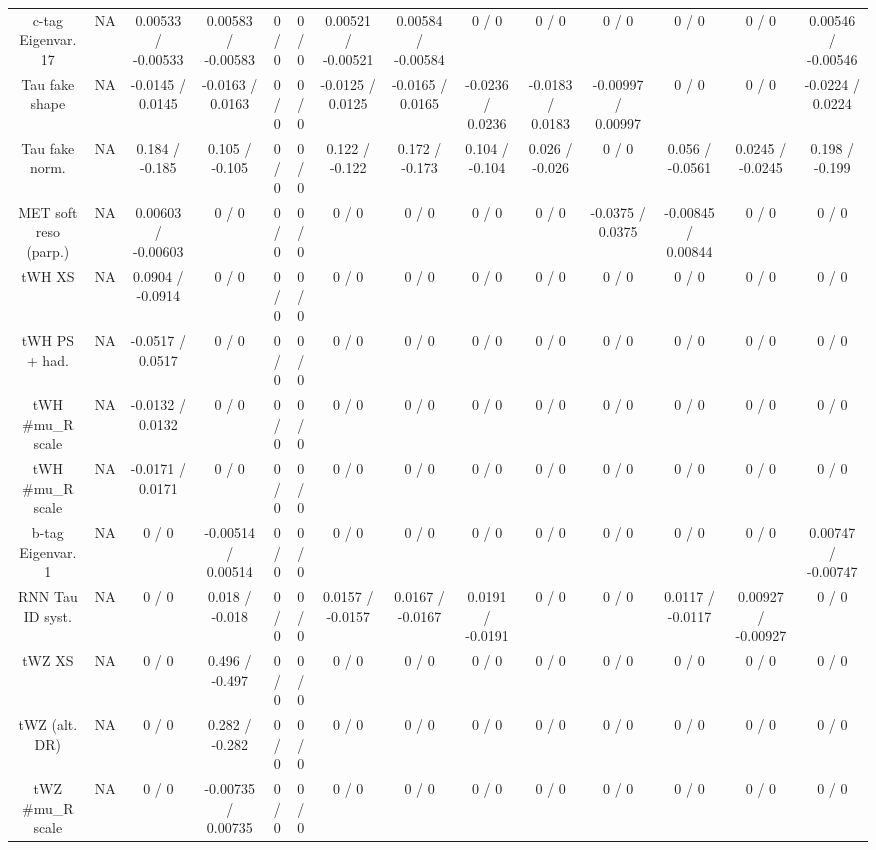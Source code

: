 \documentclass[10pt]{article}
\begin{document}
\begin{table}[htbp]
\begin{center}
\begin{tabular}{|c|c|c|c|c|c|c|c|c|c|c|c|c|c|}
  c-tag Eigenvar. 17 &    NA    & 0.00533 / -0.00533 & 0.00583 / -0.00583 & 0 / 0 & 0 / 0 & 0.00521 / -0.00521 & 0.00584 / -0.00584 & 0 / 0 & 0 / 0 & 0 / 0 & 0 / 0 & 0 / 0 & 0.00546 / -0.00546 \\ 
  Tau fake shape &    NA    & -0.0145 / 0.0145 & -0.0163 / 0.0163 & 0 / 0 & 0 / 0 & -0.0125 / 0.0125 & -0.0165 / 0.0165 & -0.0236 / 0.0236 & -0.0183 / 0.0183 & -0.00997 / 0.00997 & 0 / 0 & 0 / 0 & -0.0224 / 0.0224 \\ 
  Tau fake norm. &    NA    & 0.184 / -0.185 & 0.105 / -0.105 & 0 / 0 & 0 / 0 & 0.122 / -0.122 & 0.172 / -0.173 & 0.104 / -0.104 & 0.026 / -0.026 & 0 / 0 & 0.056 / -0.0561 & 0.0245 / -0.0245 & 0.198 / -0.199 \\ 
  MET soft reso (parp.) &    NA    & 0.00603 / -0.00603 & 0 / 0 & 0 / 0 & 0 / 0 & 0 / 0 & 0 / 0 & 0 / 0 & 0 / 0 & -0.0375 / 0.0375 & -0.00845 / 0.00844 & 0 / 0 & 0 / 0 \\ 
  tWH XS &    NA    & 0.0904 / -0.0914 & 0 / 0 & 0 / 0 & 0 / 0 & 0 / 0 & 0 / 0 & 0 / 0 & 0 / 0 & 0 / 0 & 0 / 0 & 0 / 0 & 0 / 0 \\ 
  tWH PS + had. &    NA    & -0.0517 / 0.0517 & 0 / 0 & 0 / 0 & 0 / 0 & 0 / 0 & 0 / 0 & 0 / 0 & 0 / 0 & 0 / 0 & 0 / 0 & 0 / 0 & 0 / 0 \\ 
  tWH #mu_{R} scale &    NA    & -0.0132 / 0.0132 & 0 / 0 & 0 / 0 & 0 / 0 & 0 / 0 & 0 / 0 & 0 / 0 & 0 / 0 & 0 / 0 & 0 / 0 & 0 / 0 & 0 / 0 \\ 
  tWH #mu_{R} scale &    NA    & -0.0171 / 0.0171 & 0 / 0 & 0 / 0 & 0 / 0 & 0 / 0 & 0 / 0 & 0 / 0 & 0 / 0 & 0 / 0 & 0 / 0 & 0 / 0 & 0 / 0 \\ 
  b-tag Eigenvar. 1 &    NA    & 0 / 0 & -0.00514 / 0.00514 & 0 / 0 & 0 / 0 & 0 / 0 & 0 / 0 & 0 / 0 & 0 / 0 & 0 / 0 & 0 / 0 & 0 / 0 & 0.00747 / -0.00747 \\ 
  RNN Tau ID syst. &    NA    & 0 / 0 & 0.018 / -0.018 & 0 / 0 & 0 / 0 & 0.0157 / -0.0157 & 0.0167 / -0.0167 & 0.0191 / -0.0191 & 0 / 0 & 0 / 0 & 0.0117 / -0.0117 & 0.00927 / -0.00927 & 0 / 0 \\ 
  tWZ XS &    NA    & 0 / 0 & 0.496 / -0.497 & 0 / 0 & 0 / 0 & 0 / 0 & 0 / 0 & 0 / 0 & 0 / 0 & 0 / 0 & 0 / 0 & 0 / 0 & 0 / 0 \\ 
  tWZ (alt. DR) &    NA    & 0 / 0 & 0.282 / -0.282 & 0 / 0 & 0 / 0 & 0 / 0 & 0 / 0 & 0 / 0 & 0 / 0 & 0 / 0 & 0 / 0 & 0 / 0 & 0 / 0 \\ 
  tWZ #mu_{R} scale &    NA    & 0 / 0 & -0.00735 / 0.00735 & 0 / 0 & 0 / 0 & 0 / 0 & 0 / 0 & 0 / 0 & 0 / 0 & 0 / 0 & 0 / 0 & 0 / 0 & 0 / 0 \\ 

\end{tabular}
\end{center}
\end{table}
\end{document}
